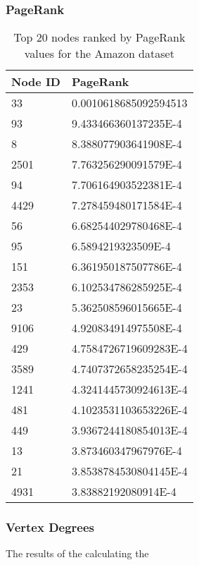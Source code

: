 \subsubsection{PageRank}

\begin{table}%
\centering
\begin{tabular}{|l|l|}
\hline
Node ID & PageRank \\
\hline
33 & 0.0010618685092594513 \\
93 & 9.433466360137235E-4 \\
8 & 8.388077903641908E-4 \\
2501 & 7.763256290091579E-4 \\
94 & 7.706164903522381E-4 \\
4429 & 7.278459480171584E-4 \\
56 & 6.682544029780468E-4 \\
95 & 6.5894219323509E-4 \\
151 & 6.361950187507786E-4 \\
2353 & 6.102534786285925E-4 \\
23 & 5.362508596015665E-4 \\
9106 & 4.920834914975508E-4 \\
429 & 4.7584726719609283E-4 \\
3589 & 4.7407372658235254E-4 \\
1241 & 4.3241445730924613E-4 \\
481 & 4.1023531103653226E-4 \\
449 & 3.9367244180854013E-4 \\
13 & 3.873460347967976E-4 \\
21 & 3.8538784530804145E-4 \\
4931 & 3.83882192080914E-4 \\
\hline
\end{tabular}
\caption{Top 20 nodes ranked by PageRank values for the Amazon dataset}
\label{tab:amazonpr}
\end{table}

\subsubsection{Vertex Degrees}
The results of the calculating the 

